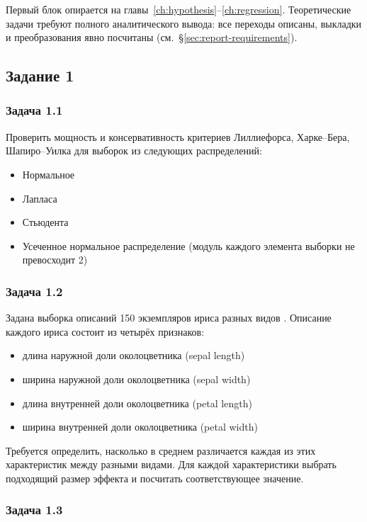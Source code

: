 Первый блок опирается на главы~\ref{ch:hypothesis}--\ref{ch:regression}.
Теоретические задачи требуют полного аналитического вывода: все переходы описаны, выкладки и преобразования явно посчитаны (см.~\S\ref{sec:report-requirements}).

\subsection{Задание 1}


\subsubsection{Задача 1.1}

Проверить мощность и консервативность критериев Лиллиефорса, Харке--Бера, Шапиро--Уилка для выборок из следующих распределений:
\begin{itemize}
    \item Нормальное
    \item Лапласа
    \item Стьюдента
    \item Усеченное нормальное распределение (модуль каждого элемента выборки не превосходит 2)
\end{itemize}

\subsubsection{Задача 1.2}

Задана выборка описаний 150 экземпляров ириса разных видов \citep{fisher1936}. Описание каждого ириса состоит из четырёх признаков:
\begin{itemize}
    \item длина наружной доли околоцветника (sepal length)
    \item ширина наружной доли околоцветника (sepal width)
    \item длина внутренней доли околоцветника (petal length)
    \item ширина внутренней доли околоцветника (petal width)
\end{itemize}
Требуется определить, насколько в среднем различается каждая из этих характеристик между разными видами.
Для каждой характеристики выбрать подходящий размер эффекта \citep{ellis2010} и посчитать соответствующее значение.

\subsubsection{Задача 1.3}

